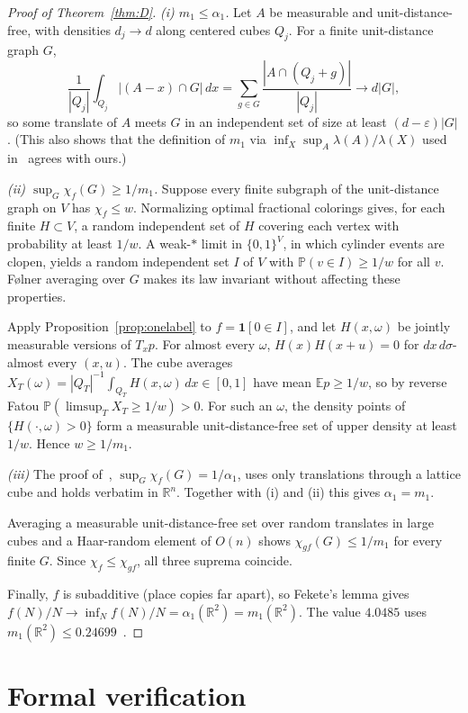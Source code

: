 \documentclass[11pt]{amsart}
\theoremstyle{definition}
\newcommand{\R}{\mathbb{R}}
\newcommand{\E}{\mathbb{E}}
\newcommand{\PP}{\mathbb{P}}
\begin{document}
\begin{proof}[Proof of Theorem~\ref{thm:D}]
\emph{(i) $m_1\le\alpha_1$.} Let $A$ be measurable and unit-distance-free, with densities $d_j\to d$ along centered cubes $Q_j$. For a finite unit-distance graph $G$,
\[
\frac1{|Q_j|}\int_{Q_j}|(A-x)\cap G|\,dx=\sum_{g\in G}\frac{|A\cap(Q_j+g)|}{|Q_j|}\to d|G| ,
\]
so some translate of $A$ meets $G$ in an independent set of size at least $(d-\varepsilon)|G|$. (This also shows that the definition of $m_1$ via $\inf_X\sup_A\lambda(A)/\lambda(X)$ used in~\cite{MRVZ} agrees with ours.)

\emph{(ii) $\sup_G\chi_f(G)\ge 1/m_1$.} Suppose every finite subgraph of the unit-distance graph on $V$ has $\chi_f\le w$. Normalizing optimal fractional colorings gives, for each finite $H\subset V$, a random independent set of $H$ covering each vertex with probability at least $1/w$. A weak-$*$ limit in $\{0,1\}^V$, in which cylinder events are clopen, yields a random independent set $I$ of $V$ with $\PP(v\in I)\ge1/w$ for all $v$. Følner averaging over $G$ makes its law invariant without affecting these properties.

Apply Proposition~\ref{prop:onelabel} to $f=\mathbf 1[0\in I]$, and let $H(x,\omega)$ be jointly measurable versions of $T_xp$. For almost every $\omega$, $H(x)H(x+u)=0$ for $dx\,d\sigma$-almost every $(x,u)$. The cube averages $X_T(\omega)=|Q_T|^{-1}\int_{Q_T}H(x,\omega)\,dx\in[0,1]$ have mean $\E p\ge1/w$, so by reverse Fatou $\PP(\limsup_TX_T\ge1/w)>0$. For such an $\omega$, the density points of $\{H(\cdot,\omega)>0\}$ form a measurable unit-distance-free set of upper density at least $1/w$. Hence $w\ge1/m_1$.

\emph{(iii)} The proof of~\cite[Theorem 2]{MRVZ}, $\sup_G\chi_f(G)=1/\alpha_1$, uses only translations through a lattice cube and holds verbatim in $\R^n$. Together with (i) and (ii) this gives $\alpha_1=m_1$.

Averaging a measurable unit-distance-free set over random translates in large cubes and a Haar-random element of $O(n)$ shows $\chi_{gf}(G)\le1/m_1$ for every finite $G$. Since $\chi_f\le\chi_{gf}$, all three suprema coincide.

Finally, $f$ is subadditive (place copies far apart), so Fekete's lemma gives $f(N)/N\to\inf_Nf(N)/N=\alpha_1(\R^2)=m_1(\R^2)$. The value $4.0485$ uses $m_1(\R^2)\le0.24699$~\cite{ACMVZ}.
\end{proof}

\section{Formal verification}\label{sec:lean}
\end{document}
